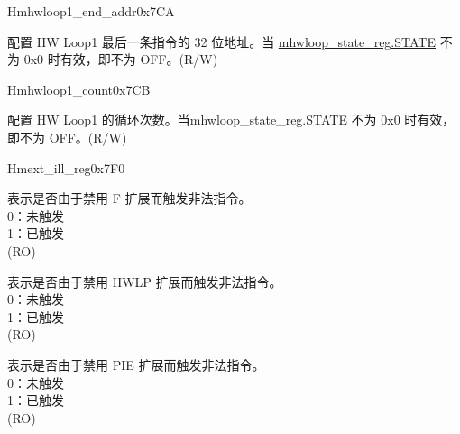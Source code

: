 \begin{register}{H}{mhwloop1\_end\_addr}{0x7CA}\label{regdesc:mhloop1_end_addr}
%
\regnewline%
\begin{regdesc}\begin{reglist}
\label{fielddesc:HWLP1_EA}\item [EA] 配置 HW Loop1 最后一条指令的 32 位地址。当 \hyperref[fielddesc:HWSTATE]{mhwloop\_state\_reg.STATE} 不为 0x0 时有效，即不为 OFF。(R/W)
\end{reglist}\end{regdesc}
\end{register}

\begin{register}{H}{mhwloop1\_count}{0x7CB}\label{regdesc:mhloop1_count}
%
%
\regnewline%
\begin{regdesc}\begin{reglist}
\label{fielddesc:MHLP1_COUNT}\item [COUNT] 配置 HW Loop1 的循环次数。当mhwloop\_state\_reg.STATE 不为 0x0 时有效，即不为 OFF。(R/W)
\end{reglist}\end{regdesc}
\end{register}

\begin{register}{H}{mext\_ill\_reg}{0x7F0}\label{regdesc:mext_ill_reg}
%
%
%
%
\regnewline%
\begin{regdesc}\begin{reglist}
\label{fielddesc:ILL_FPU}\item [ILL\_FPU] 表示是否由于禁用 F 扩展而触发非法指令。\\
0：未触发\\
1：已触发\\
(RO)
\label{fielddesc:ILL_HWL}\item [ILL\_HWL] 表示是否由于禁用 HWLP 扩展而触发非法指令。\\
0：未触发\\
1：已触发\\
(RO)
\label{fielddesc:ILL_PIE}\item [ILL\_PIE] 表示是否由于禁用 PIE 扩展而触发非法指令。\\
0：未触发\\
1：已触发\\
(RO)
\end{reglist}\end{regdesc}
\end{register}

